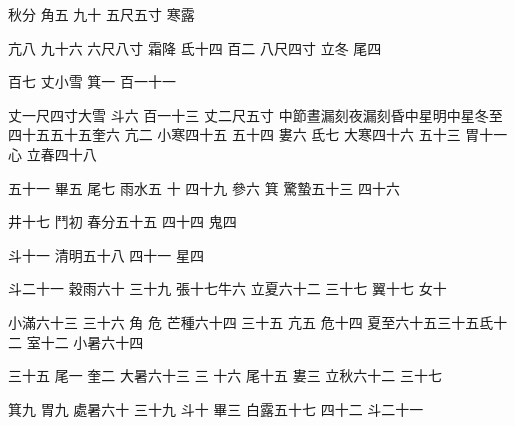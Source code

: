 \begin{pinyinscope}
秋分
 角五
 九十
 五尺五寸
 寒露


亢八
 九十六
 六尺八寸
  霜降
 氐十四
 百二
 八尺四寸
 立冬
 尾四


百七
 丈小雪
 箕一
 百一十一


丈一尺四寸大雪
 斗六
 百一十三
 丈二尺五寸
 中節晝漏刻夜漏刻昏中星明中星冬至四十五五十五奎六
 亢二
 小寒四十五
 五十四
 婁六
 氐七
 大寒四十六
 五十三
 胃十一
 心
 立春四十八


五十一
 畢五
 尾七
 雨水五
 十
 四十九
 參六
 箕
 驚蟄五十三
 四十六


井十七
 鬥初
 春分五十五
 四十四
 鬼四


斗十一
 清明五十八
 四十一
 星四


斗二十一
 穀雨六十
 三十九
 張十七牛六
 立夏六十二
 三十七
 翼十七
 女十


小滿六十三
 三十六
 角
 危
 芒種六十四
 三十五
 亢五
 危十四
 夏至六十五三十五氐十二
 室十二
 小暑六十四


三十五
 尾一
 奎二
 大暑六十三
 三
 十六
 尾十五
 婁三
 立秋六十二
 三十七


箕九
 胃九
 處暑六十
 三十九
 斗十
 畢三
 白露五十七
 四十二
 斗二十一



\end{pinyinscope}
